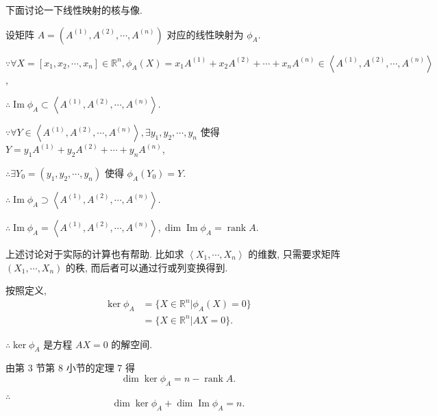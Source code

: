 \documentclass{ctexart}
\begin{document}
下面讨论一下线性映射的核与像.

设矩阵 $A=(A^{(1)},A^{(2)},\cdots,A^{(n)})$ 对应的线性映射为 $\phi_A$.

$\because\forall X=[x_1,x_2,\cdots,x_n]\in\mathbb{R}^n,\phi_A(X)=x_1A^{(1)}+x_2A^{(2)}+\cdots+x_nA^{(n)}\in\left<A^{(1)},A^{(2)},\cdots,A^{(n)}\right>$,

$\therefore\operatorname{Im}\phi_A\subset\left<A^{(1)},A^{(2)},\cdots,A^{(n)}\right>$.

$\because\forall Y\in\left<A^{(1)},A^{(2)},\cdots,A^{(n)}\right>,\exists y_1,y_2,\cdots,y_n$ 使得 $Y=y_1A^{(1)}+y_2A^{(2)}+\cdots+y_nA^{(n)}$,

$\therefore\exists Y_0=(y_1,y_2,\cdots,y_n)$ 使得 $\phi_A(Y_0)=Y$.

$\therefore\operatorname{Im}\phi_A\supset\left<A^{(1)},A^{(2)},\cdots,A^{(n)}\right>$.

$\therefore\operatorname{Im}\phi_A=\left<A^{(1)},A^{(2)},\cdots,A^{(n)}\right>,\dim\operatorname{Im}\phi_A=\operatorname{rank}A$.

上述讨论对于实际的计算也有帮助. 比如求 $\left<X_1,\cdots,X_n\right>$ 的维数, 只需要求矩阵 $(X_1,\cdots,X_n)$ 的秩, 而后者可以通过行或列变换得到.

按照定义,
\begin{align*}
    \ker\phi_A & =\{X\in\mathbb{R}^n|\phi_A(X)=0\} \\
    & =\{X\in\mathbb{R}^n|AX=0\}.
\end{align*}

$\therefore\ker\phi_A$ 是方程 $AX=0$ 的解空间.

由第 3 节第 8 小节的定理 7 得
\[\dim\ker\phi_A=n-\operatorname{rank}A.\]

$\therefore$
\[\dim\ker\phi_A+\dim\operatorname{Im}\phi_A=n.\]
\end{document}
